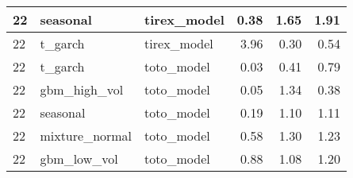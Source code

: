 {\begin{tabular}{lllrrr}
\midrule
22 & seasonal & tirex\_model & 0.38 & 1.65 & 1.91 \\
\midrule
22 & t\_garch & tirex\_model & 3.96 & 0.30 & 0.54 \\
\midrule
22 & t\_garch & toto\_model & 0.03 & 0.41 & 0.79 \\
\midrule
22 & gbm\_high\_vol & toto\_model & 0.05 & 1.34 & 0.38 \\
\midrule
22 & seasonal & toto\_model & 0.19 & 1.10 & 1.11 \\
\midrule
22 & mixture\_normal & toto\_model & 0.58 & 1.30 & 1.23 \\
\midrule
22 & gbm\_low\_vol & toto\_model & 0.88 & 1.08 & 1.20 \\
\bottomrule
\end{tabular}
}